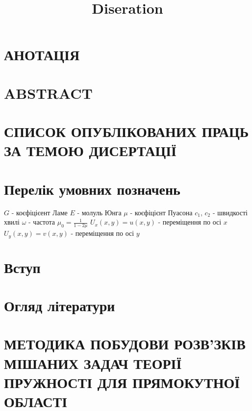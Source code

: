 \documentclass[a4paper,14pt]{extarticle}
\title{Diseration}
\author{}
\date{}
\numberwithin{equation}{section}
\begin{document}
\section*{\centering АНОТАЦІЯ}


\section*{\centering ABSTRACT}


\section*{\centering СПИСОК ОПУБЛІКОВАНИХ ПРАЦЬ ЗА ТЕМОЮ ДИСЕРТАЦІЇ}


\newpage

\renewcommand{\contentsname}{\centering Зміст}
\tableofcontents

\newpage

\section*{\centering Перелік умовних позначень}
$G$ - коєфіцієент Ламе \newline
$E$ - молуль Юнга \newline
$\mu$ - коєфіцієнт Пуасона \newline
$c_1$, $c_2$ - швидкості хвилі \newline
$\omega$ - частота \newline
$\mu_0 = \frac{1}{1 - 2\mu}$ \newline
$U_x(x,y) = u(x,y)$ - переміщення по осі $x$ \newline
$U_y(x,y) = v(x,y)$ - переміщення по осі $y$
\newpage

\section*{\centering Вступ}

\newpage

\section{\centering Огляд літератури}

\newpage

\section{\centering МЕТОДИКА ПОБУДОВИ РОЗВ’ЗКІВ МІШАНИХ ЗАДАЧ ТЕОРІЇ ПРУЖНОСТІ ДЛЯ ПРЯМОКУТНОЇ ОБЛАСТІ}

\newpage
\end{document}

